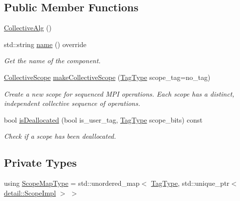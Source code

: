 \subsection*{Public Member Functions}
\begin{DoxyCompactItemize}
\item 
\hyperlink{structvt_1_1collective_1_1_collective_alg_aa137479fb6afcfa33e73592ea3cbbcd8}{Collective\+Alg} ()
\item 
std\+::string \hyperlink{structvt_1_1collective_1_1_collective_alg_a81788afa34bc094c9f71fef8681aefb3}{name} () override
\begin{DoxyCompactList}\small\item\em Get the name of the component. \end{DoxyCompactList}\item 
\hyperlink{structvt_1_1collective_1_1_collective_scope}{Collective\+Scope} \hyperlink{structvt_1_1collective_1_1_collective_alg_a6f2b4c832a5cc11cb7dfc238ecd48edf}{make\+Collective\+Scope} (\hyperlink{namespacevt_a84ab281dae04a52a4b243d6bf62d0e52}{Tag\+Type} scope\+\_\+tag=no\+\_\+tag)
\begin{DoxyCompactList}\small\item\em Create a new scope for sequenced M\+PI operations. Each scope has a distinct, independent collective sequence of operations. \end{DoxyCompactList}\item 
bool \hyperlink{structvt_1_1collective_1_1_collective_alg_ae57f4f34b34540d652c15f5dffeae54c}{is\+Deallocated} (bool is\+\_\+user\+\_\+tag, \hyperlink{namespacevt_a84ab281dae04a52a4b243d6bf62d0e52}{Tag\+Type} scope\+\_\+bits) const
\begin{DoxyCompactList}\small\item\em Check if a scope has been deallocated. \end{DoxyCompactList}\end{DoxyCompactItemize}
\subsection*{Private Types}
\begin{DoxyCompactItemize}
\item 
using \hyperlink{structvt_1_1collective_1_1_collective_alg_abf644b20fe35cf654f5d4a6702ef5183}{Scope\+Map\+Type} = std\+::unordered\+\_\+map$<$ \hyperlink{namespacevt_a84ab281dae04a52a4b243d6bf62d0e52}{Tag\+Type}, std\+::unique\+\_\+ptr$<$ \hyperlink{structvt_1_1collective_1_1detail_1_1_scope_impl}{detail\+::\+Scope\+Impl} $>$ $>$
\end{DoxyCompactItemize}
